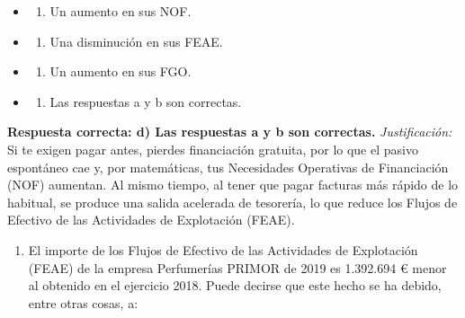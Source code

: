 \documentclass[12pt]{book} %
\providecommand{\tightlist}{%
  \setlength{\itemsep}{0pt}\setlength{\parskip}{0pt}}
\begin{document}
\begin{itemize}
\item
  \begin{enumerate}
  \def\labelenumi{\alph{enumi})}
  \tightlist
  \item
    Un aumento en sus NOF.
  \end{enumerate}
\item
  \begin{enumerate}
  \def\labelenumi{\alph{enumi})}
  \setcounter{enumi}{1}
  \tightlist
  \item
    Una disminución en sus FEAE.
  \end{enumerate}
\item
  \begin{enumerate}
  \def\labelenumi{\alph{enumi})}
  \setcounter{enumi}{2}
  \tightlist
  \item
    Un aumento en sus FGO.
  \end{enumerate}
\item
  \begin{enumerate}
  \def\labelenumi{\alph{enumi})}
  \setcounter{enumi}{3}
  \tightlist
  \item
    Las respuestas a y b son correctas.
  \end{enumerate}
\end{itemize}

\textbf{Respuesta correcta: d) Las respuestas a y b son correctas.}
\emph{Justificación:} Si te exigen pagar antes, pierdes financiación
gratuita, por lo que el pasivo espontáneo cae y, por matemáticas, tus
Necesidades Operativas de Financiación (NOF) aumentan. Al mismo tiempo,
al tener que pagar facturas más rápido de lo habitual, se produce una
salida acelerada de tesorería, lo que reduce los Flujos de Efectivo de
las Actividades de Explotación (FEAE).

\begin{enumerate}
\def\labelenumi{\arabic{enumi}.}
\setcounter{enumi}{5}
\tightlist
\item
  El importe de los Flujos de Efectivo de las Actividades de Explotación
  (FEAE) de la empresa Perfumerías PRIMOR de 2019 es 1.392.694 € menor
  al obtenido en el ejercicio 2018. Puede decirse que este hecho se ha
  debido, entre otras cosas, a:
\end{enumerate}
\end{document}
